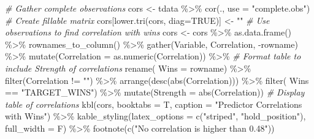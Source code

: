 \documentclass[
]{article}
\newenvironment{Shaded}{\begin{snugshade}}{\end{snugshade}}
\newcommand{\AttributeTok}[1]{\textcolor[rgb]{0.77,0.63,0.00}{#1}}
\newcommand{\CommentTok}[1]{\textcolor[rgb]{0.56,0.35,0.01}{\textit{#1}}}
\newcommand{\ConstantTok}[1]{\textcolor[rgb]{0.00,0.00,0.00}{#1}}
\newcommand{\FunctionTok}[1]{\textcolor[rgb]{0.00,0.00,0.00}{#1}}
\newcommand{\NormalTok}[1]{#1}
\newcommand{\OtherTok}[1]{\textcolor[rgb]{0.56,0.35,0.01}{#1}}
\newcommand{\SpecialCharTok}[1]{\textcolor[rgb]{0.00,0.00,0.00}{#1}}
\newcommand{\StringTok}[1]{\textcolor[rgb]{0.31,0.60,0.02}{#1}}
\begin{document}
\begin{Shaded}
\begin{Highlighting}[]
\CommentTok{\# Gather complete observations}
\NormalTok{cors }\OtherTok{\textless{}{-}}\NormalTok{ tdata }\SpecialCharTok{\%\textgreater{}\%} 
  \FunctionTok{cor}\NormalTok{(., }\AttributeTok{use =} \StringTok{"complete.obs"}\NormalTok{) }
\CommentTok{\# Create fillable matrix}
\NormalTok{cors[}\FunctionTok{lower.tri}\NormalTok{(cors, }\AttributeTok{diag=}\ConstantTok{TRUE}\NormalTok{)] }\OtherTok{\textless{}{-}} \StringTok{""}
\CommentTok{\# Use observations to find correlation with wins}
\NormalTok{cors }\OtherTok{\textless{}{-}}\NormalTok{ cors }\SpecialCharTok{\%\textgreater{}\%}
  \FunctionTok{as.data.frame}\NormalTok{() }\SpecialCharTok{\%\textgreater{}\%}
  \FunctionTok{rownames\_to\_column}\NormalTok{() }\SpecialCharTok{\%\textgreater{}\%}
  \FunctionTok{gather}\NormalTok{(Variable, Correlation, }\SpecialCharTok{{-}}\NormalTok{rowname) }\SpecialCharTok{\%\textgreater{}\%}
  \FunctionTok{mutate}\NormalTok{(}\AttributeTok{Correlation =} \FunctionTok{as.numeric}\NormalTok{(Correlation)) }\SpecialCharTok{\%\textgreater{}\%}
\CommentTok{\# Format table to include Strength of correlations}
  \FunctionTok{rename}\NormalTok{(}\StringTok{\textasciigrave{}}\AttributeTok{ Wins}\StringTok{\textasciigrave{}} \OtherTok{=}\NormalTok{ rowname) }\SpecialCharTok{\%\textgreater{}\%}
  \FunctionTok{filter}\NormalTok{(Correlation }\SpecialCharTok{!=} \StringTok{""}\NormalTok{) }\SpecialCharTok{\%\textgreater{}\%}
  \FunctionTok{arrange}\NormalTok{(}\FunctionTok{desc}\NormalTok{(}\FunctionTok{abs}\NormalTok{(Correlation))) }\SpecialCharTok{\%\textgreater{}\%} 
  \FunctionTok{filter}\NormalTok{(}\StringTok{\textasciigrave{}}\AttributeTok{ Wins}\StringTok{\textasciigrave{}} \SpecialCharTok{==} \StringTok{"TARGET\_WINS"}\NormalTok{) }\SpecialCharTok{\%\textgreater{}\%} 
  \FunctionTok{mutate}\NormalTok{(}\AttributeTok{Strength =} \FunctionTok{abs}\NormalTok{(Correlation)) }
\CommentTok{\# Display table of correlations}
\FunctionTok{kbl}\NormalTok{(cors, }\AttributeTok{booktabs =}\NormalTok{ T, }\AttributeTok{caption =} \StringTok{"Predictor Correlations with Wins"}\NormalTok{) }\SpecialCharTok{\%\textgreater{}\%}
  \FunctionTok{kable\_styling}\NormalTok{(}\AttributeTok{latex\_options =} \FunctionTok{c}\NormalTok{(}\StringTok{"striped"}\NormalTok{, }\StringTok{"hold\_position"}\NormalTok{),}
                \AttributeTok{full\_width =}\NormalTok{ F) }\SpecialCharTok{\%\textgreater{}\%}
  \FunctionTok{footnote}\NormalTok{(}\FunctionTok{c}\NormalTok{(}\StringTok{"No correlation is higher than 0.48"}\NormalTok{))}
\end{Highlighting}
\end{Shaded}
\end{document}
